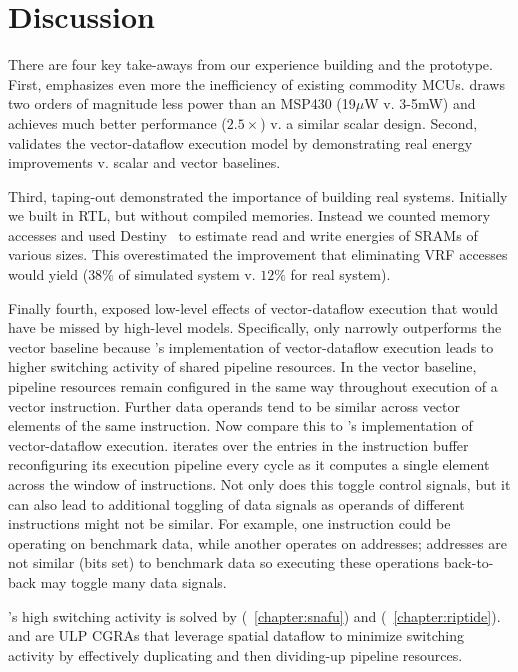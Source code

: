 \section{Discussion}
\label{manic:discuss}
There are four key take-aways from our experience building \manic and the \msilicon prototype.
% 
First, \msilicon emphasizes even more the inefficiency of existing commodity MCUs.
% 
\manic draws two orders of magnitude less power than an MSP430 (19$\mu$W v. 3-5mW) and achieves much better performance ($2.5\times$) v. a similar scalar design.
% 
Second, \msilicon validates the vector-dataflow execution model by demonstrating real energy improvements v. scalar and vector baselines.


Third, taping-out \msilicon demonstrated the importance of building real systems.
% 
Initially we built \manic in RTL, but without compiled memories.
% 
Instead we counted memory accesses and used Destiny~\cite{destiny} to estimate read and write energies of SRAMs of various sizes.
% 
This overestimated the improvement that eliminating VRF accesses would yield ($38\%$ of simulated system v. $12\%$ for real system).

Finally fourth, \msilicon exposed low-level effects of vector-dataflow execution that would have be missed by high-level models.
% 
Specifically, \manic only narrowly outperforms the vector baseline because \manic's implementation of vector-dataflow execution leads to higher switching activity of shared pipeline resources.
% 
In the vector baseline, pipeline resources remain configured in the same way throughout execution of a vector instruction.
% 
Further data operands tend to be similar across vector elements of the same instruction.
% 
Now compare this to \manic's implementation of vector-dataflow execution.
% 
\manic iterates over the entries in the instruction buffer reconfiguring its execution pipeline every cycle as it computes a single element across the window of instructions.
% 
Not only does this toggle control signals, but it can also lead to additional toggling of data signals as operands of different instructions might not be similar.
% 
For example, one instruction could be operating on benchmark data, while another operates on addresses; addresses are not similar (bits set) to benchmark data so executing these operations back-to-back may toggle many data signals. 

\manic's high switching activity is solved by \snafu (~\autoref{chapter:snafu}) and \riptide (~\autoref{chapter:riptide}).
% 
\riptide and \snafu are ULP CGRAs that leverage spatial dataflow to minimize switching activity by effectively duplicating and then dividing-up pipeline resources.
